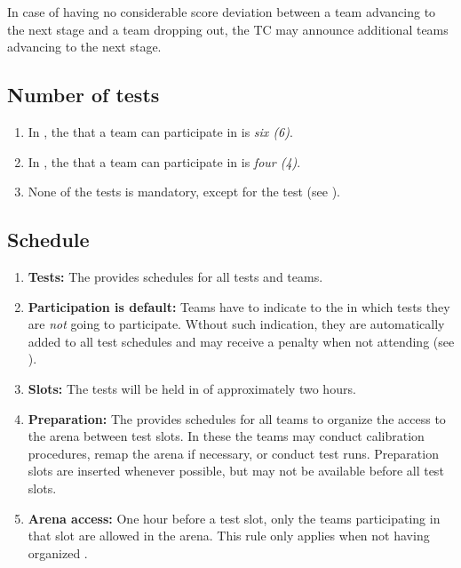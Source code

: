 In case of having no considerable score deviation between a team advancing to the next stage and a team dropping out, the TC may announce additional teams advancing to the next stage.


\subsection{Number of tests}\label{rule:number_of_tests}

\begin{enumerate}
	\item In , the  that a team can participate in is \emph{six (6)}.
	\item In , the  that a team can participate in is \emph{four (4)}.
	\item None of the tests is mandatory, except for the  test (see ).
\end{enumerate}


\subsection{Schedule}
\label{rule:schedule}

\begin{enumerate}
	\item \textbf{Tests:} The  provides schedules for all tests and teams. 
	\item \textbf{Participation is default:} Teams have to indicate to the  in which tests they are \emph{not} going to participate. Wthout such indication, they are automatically added to all test schedules and may receive a penalty when not attending (see ).
	\item \textbf{Slots:} The tests will be held in  of approximately two hours.
	\item \textbf{Preparation:} The  provides schedules for all teams to organize the access to the arena between test slots. In these  the teams may conduct calibration procedures, remap the arena if necessary, or conduct test runs.
	Preparation slots are inserted whenever possible, but may not be available before all test slots. 
	\item \textbf{Arena access:} One hour before a test slot, only the teams participating in that slot are allowed in the arena.
This rule only applies when not having organized .   
\end{enumerate}



